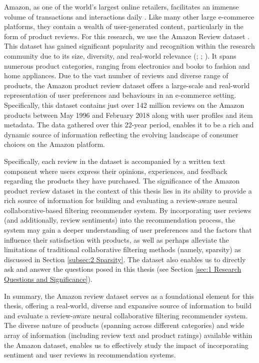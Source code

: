 Amazon, as one of the world's largest online retailers, facilitates an immense volume of transactions and interactions daily \cite{kaushik2018exploring}. Like many other large e-commerce platforms, they contain a wealth of user-generated content, particularly in the form of product reviews. For this research, we use the Amazon Review dataset \cite{mcauley2013hidden}. This dataset has gained significant popularity and recognition within the research community due to its size, diversity, and real-world relevance (\cite{kaushik2018exploring}; \cite{haque2018sentiment}; \cite{skalicky2015statistical}). It spans numerous product categories, ranging from electronics and books to fashion and home appliances. Due to the vast number of reviews and diverse range of products, the Amazon product review dataset offers a large-scale and real-world representation of user preferences and behaviours in an e-commerce setting. Specifically, this dataset contains just over 142 million reviews on the Amazon products between May 1996 and February 2018 along with user profiles and item metadata. The data gathered over this 22-year period, enables it to be a rich and dynamic source of information reflecting the evolving landscape of consumer choices on the Amazon platform.

Specifically, each review in the dataset is accompanied by a written text component where users express their opinions, experiences, and feedback regarding the products they have purchased. The significance of the Amazon product review dataset in the context of this thesis lies in its ability to provide a rich source of information for building and evaluating a review-aware neural collaborative-based filtering recommender system. By incorporating user reviews (and additionally, review sentiments) into the recommendation process, the system may gain a deeper understanding of user preferences and the factors that influence their satisfaction with products, as well as perhaps alleviate the limitations of traditional collaborative filtering methods (namely, sparsity) as discussed in Section \ref{subsec:2 Sparsity}. The dataset also enables us to directly ask and answer the questions posed in this thesis (see Section \ref{sec:1 Research Questions and Significance}). 

In summary, the Amazon review dataset serves as a foundational element for this thesis, offering a real-world, diverse and expansive source of information to build and evaluate a review-aware neural collaborative filtering recommender system. The diverse nature of products (spanning across different categories) and wide array of information (including review text and product ratings) available within the Amazon dataset, enables us to effectively study the impact of incorporating sentiment and user reviews in recommendation systems. 


